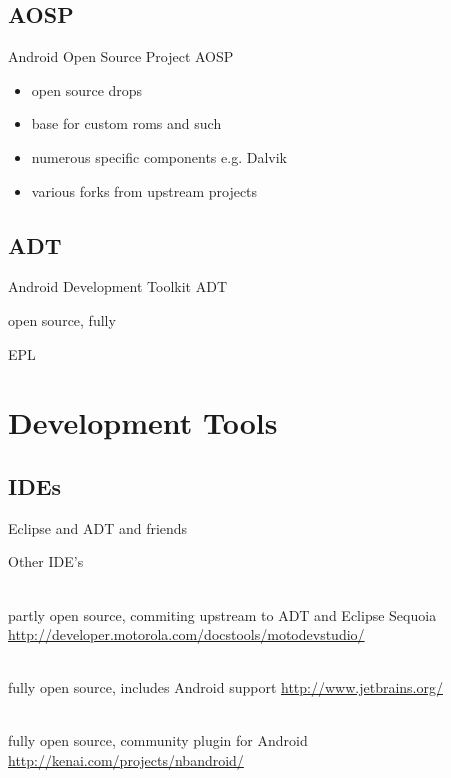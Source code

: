\documentclass[aspectratio=169]{beamer}
\newcommand{\surl}[1] {{\tiny \url{#1}}}
\begin{document}
  \subsection{AOSP}
    \begin{frame}{Android Open Source Project AOSP}
      \begin{itemize}
        \item<1->open source drops
        \item<2->base for custom roms and such
        \item<3->numerous specific components e.g. Dalvik
        \item<4->various forks from upstream projects
      \end{itemize}
    \end{frame}

  \subsection{ADT}
    \begin{frame}{Android Development Toolkit ADT}
      \begin{description}
        \item<1->open source, fully 
        \item<2->EPL
      \end{description}
    \end{frame}

\section{Development Tools}

  \subsection{IDEs}

    \begin{frame}{Eclipse and ADT and friends}
      
    \end{frame}

    \begin{frame}{Other IDE's}
      \begin{description}
        \item<1->[Motorola Motodev Studio for Android] \hfill \\  partly open source, commiting upstream to ADT and Eclipse Sequoia \surl{http://developer.motorola.com/docstools/motodevstudio/}
        \item<2->[Jetbrains IntelliJ IDEA CE] \hfill \\ fully open source, includes Android support \surl{http://www.jetbrains.org/}
        \item<3->[Oracle Netbeans] \hfill \\ fully open source, community plugin for Android \surl{http://kenai.com/projects/nbandroid/}
      \end{description}
    \end{frame}
\end{document}
